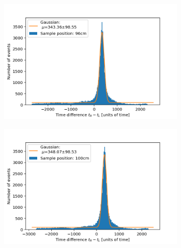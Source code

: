\documentclass[]{article}
\begin{document}
\begin{figure}[H]
\medskip
\begin{subfigure}{0.48\textwidth}
\includegraphics[width=\linewidth]{Plots/Pos/96cm.png}
\end{subfigure}
\begin{subfigure}[c]{0.48\linewidth}
\includegraphics[width=\linewidth]{Plots/Pos/100cm.png}
\end{subfigure}


\end{figure}
\end{document}
